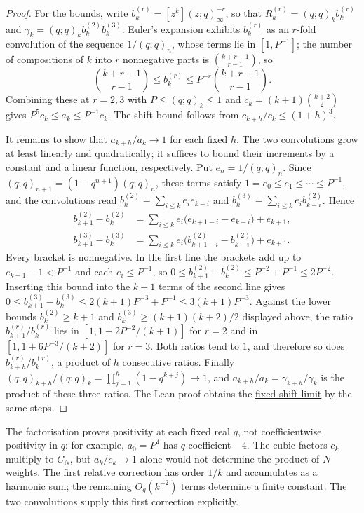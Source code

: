 \begin{proof}
For the bounds, write $b_k^{(r)}=[z^k](z;q)_\infty^{-r}$, so that
$R_k^{(r)}=(q;q)_kb_k^{(r)}$ and
$\gamma_k=(q;q)_kb_k^{(2)}b_k^{(3)}$. Euler's expansion exhibits $b_k^{(r)}$ as
an $r$-fold convolution of the sequence $1/(q;q)_n$, whose terms lie in
$[1,P^{-1}]$; the number of compositions of $k$ into $r$ nonnegative parts is
$\binom{k+r-1}{r-1}$, so
\[
 \binom{k+r-1}{r-1}\le b_k^{(r)}\le P^{-r}\binom{k+r-1}{r-1}.
\]
Combining these at $r=2,3$ with $P\le(q;q)_k\le1$ and
$c_k=(k+1)\binom{k+2}2$ gives $P^5c_k\le a_k\le P^{-1}c_k$. The shift bound
follows from $c_{k+h}/c_k\le(1+h)^3$.

It remains to show that $a_{k+h}/a_k\to1$ for each fixed $h$.
The two convolutions grow at least linearly and quadratically;
it suffices to bound their increments by a constant and a linear
function, respectively. Put $e_n=1/(q;q)_n$. Since $(q;q)_{n+1}=(1-q^{n+1})(q;q)_n$, these terms satisfy
$1=e_0\le e_1\le\cdots\le P^{-1}$, and the convolutions read
$b_k^{(2)}=\sum_{i\le k}e_ie_{k-i}$ and
$b_k^{(3)}=\sum_{i\le k}e_ib_{k-i}^{(2)}$. Hence
\[
 \begin{aligned}
 b_{k+1}^{(2)}-b_k^{(2)}
 &=\sum_{i\le k}e_i\bigl(e_{k+1-i}-e_{k-i}\bigr)+e_{k+1},\\
 b_{k+1}^{(3)}-b_k^{(3)}
 &=\sum_{i\le k}e_i\bigl(b_{k+1-i}^{(2)}-b_{k-i}^{(2)}\bigr)+e_{k+1}.
 \end{aligned}
\]
Every bracket is nonnegative. In the first line the brackets add up to
$e_{k+1}-1<P^{-1}$ and each $e_i\le P^{-1}$, so
$0\le b_{k+1}^{(2)}-b_k^{(2)}\le P^{-2}+P^{-1}\le2P^{-2}$. Inserting this
bound into the $k+1$ terms of the second line gives
$0\le b_{k+1}^{(3)}-b_k^{(3)}\le2(k+1)P^{-3}+P^{-1}\le3(k+1)P^{-3}$.
Against the lower bounds $b_k^{(2)}\ge k+1$ and
$b_k^{(3)}\ge(k+1)(k+2)/2$ displayed above, the ratio
$b_{k+1}^{(r)}/b_k^{(r)}$ lies in $[1,1+2P^{-2}/(k+1)]$ for $r=2$ and in
$[1,1+6P^{-3}/(k+2)]$ for $r=3$. Both ratios tend to $1$, and therefore so
does $b_{k+h}^{(r)}/b_k^{(r)}$, a product of $h$ consecutive ratios.
Finally $(q;q)_{k+h}/(q;q)_k=\prod_{j=1}^h(1-q^{k+j})\to1$, and
$a_{k+h}/a_k=\gamma_{k+h}/\gamma_k$ is the product of these three ratios.
The Lean proof obtains the
\href{\laterepobase/lean/ErdosProblems/Erdos1049/PaperCompleteR21/RogersFactorisationAnalytic.lean\#L1097}{fixed-shift limit}
by the same steps.
\end{proof}

The factorisation proves positivity at each fixed real $q$, not
coefficientwise positivity in $q$: for example, $a_0=P^4$ has
$q$-coefficient $-4$. The cubic factors $c_k$ multiply to $C_N$,
but $a_k/c_k\to1$ alone would not determine the product of $N$ weights. The first
relative correction has order $1/k$ and accumulates as a harmonic
sum; the remaining $O_q(k^{-2})$ terms determine a finite constant.
The two convolutions supply this first correction explicitly.

